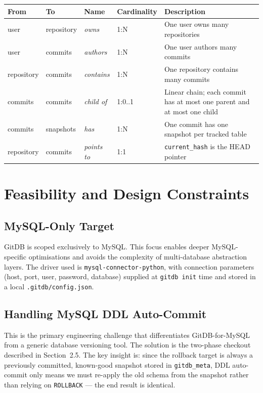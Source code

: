 \documentclass[12pt, a4paper]{article}
\begin{document}
\begin{center}
\renewcommand{\arraystretch}{1.5}
\begin{tabular}{l l l l p{4.5cm}}
\toprule
\textbf{From} & \textbf{To} & \textbf{Name} & \textbf{Cardinality} & \textbf{Description} \\
\midrule
user       & repository & \textit{owns}      & 1:N      & One user owns many repositories \\
user       & commits    & \textit{authors}   & 1:N      & One user authors many commits \\
repository & commits    & \textit{contains}  & 1:N      & One repository contains many commits \\
commits    & commits    & \textit{child of}  & 1:0..1   & Linear chain; each commit has at most one parent and at most one child \\
commits    & snapshots  & \textit{has}       & 1:N      & One commit has one snapshot per tracked table \\
repository & commits    & \textit{points to} & 1:1      & \texttt{current\_hash} is the HEAD pointer \\
\bottomrule
\end{tabular}
\end{center}

\section{Feasibility and Design Constraints}

\subsection{MySQL-Only Target}

GitDB is scoped exclusively to MySQL. This focus enables deeper MySQL-specific
optimisations and avoids the complexity of multi-database abstraction layers. The
driver used is \texttt{mysql-connector-python}, with connection parameters (host,
port, user, password, database) supplied at \texttt{gitdb init} time and stored
in a local \texttt{.gitdb/config.json}.

\subsection{Handling MySQL DDL Auto-Commit}

This is the primary engineering challenge that differentiates GitDB-for-MySQL
from a generic database versioning tool. The solution is the two-phase checkout
described in Section~2.5. The key insight is: since the rollback target is always
a previously committed, known-good snapshot stored in \texttt{gitdb\_meta}, DDL
auto-commit only means we must re-apply the old schema from the snapshot rather
than relying on \texttt{ROLLBACK} --- the end result is identical.
\end{document}
